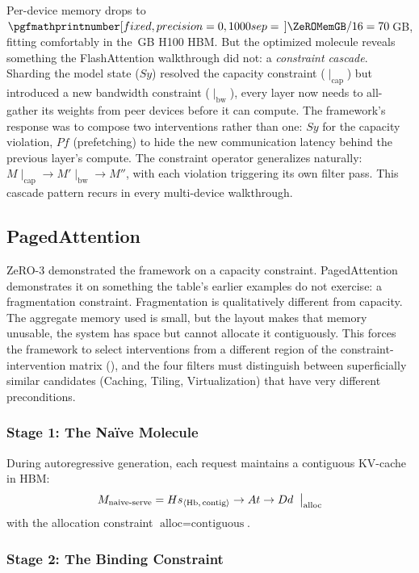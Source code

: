 \documentclass[10pt,twocolumn]{article}
\newcommand{\cvalint}[1]{\pgfmathprintnumber[fixed, precision=0, 1000 sep={\,}]{#1}}
\begin{document}
Per-device memory drops to $\cvalint{\ZeROMemGB} / 16 = 70$\,GB, fitting comfortably in the \cvalint{\HhHBMGB}\,GB H100 HBM. But the optimized molecule reveals something the FlashAttention walkthrough did not: a \emph{constraint cascade}. Sharding the model state ($Sy$) resolved the capacity constraint ($\mid_{\text{cap}}$) but introduced a new bandwidth constraint ($\mid_{\text{bw}}$), every layer now needs to all-gather its weights from peer devices before it can compute. The framework's response was to compose two interventions rather than one: $Sy$ for the capacity violation, $Pf$ (prefetching) to hide the new communication latency behind the previous layer's compute. The constraint operator generalizes naturally: $M \mid_{\text{cap}} \to M' \mid_{\text{bw}} \to M''$, with each violation triggering its own filter pass. This cascade pattern recurs in every multi-device walkthrough.

\subsection{PagedAttention}
\label{sec:paged-attention}

ZeRO-3 demonstrated the framework on a capacity constraint. PagedAttention demonstrates it on something the table's earlier examples do not exercise: a fragmentation constraint. Fragmentation is qualitatively different from capacity. The aggregate memory used is small, but the layout makes that memory unusable, the system has space but cannot allocate it contiguously. This forces the framework to select interventions from a different region of the constraint-intervention matrix (), and the four filters must distinguish between superficially similar candidates (Caching, Tiling, Virtualization) that have very different preconditions.

\subsubsection{Stage 1: The Na\"ive Molecule}

During autoregressive generation, each request maintains a contiguous KV-cache in HBM:
\begin{equation*}
M_{\text{naive-serve}} = Hs_{\langle \text{Hb},\, \text{contig} \rangle} \rightarrow At \rightarrow Dd \;\bigm|_{\text{alloc}}
\end{equation*}
with the allocation constraint $\text{alloc} = \text{contiguous}$.

\subsubsection{Stage 2: The Binding Constraint}
\end{document}
